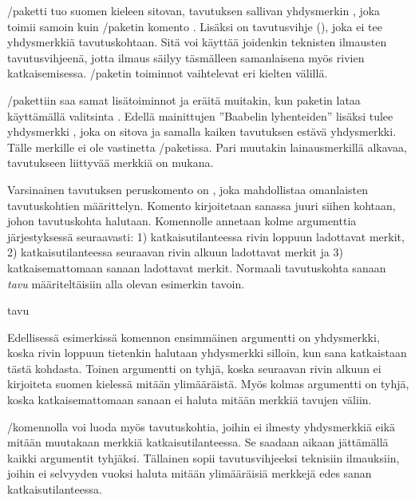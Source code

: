 \-/paketti tuo suomen kieleen sitovan, tavutuksen
sallivan yhdysmerkin \koodi{\textquotedbl-}, joka toimii samoin kuin
\-/paketin komento \koodi{\keno=/}. Lisäksi on
tavutusvihje (\koodi{\textquotedbl\textquotedbl}), joka ei tee
yhdysmerkkiä tavutuskohtaan. Sitä voi käyttää joidenkin teknisten
ilmausten tavutusvihjeenä, jotta ilmaus säilyy täsmälleen samanlaisena
myös rivien katkaisemisessa. \-/paketin toiminnot
vaihtelevat eri kielten välillä.

\-/pakettiin saa samat lisätoiminnot ja eräitä
muitakin, kun paketin lataa käyttämällä valitsinta
. Edellä mainittujen ''Baabelin lyhenteiden''
lisäksi tulee yhdysmerkki \koodi{\textquotedbl\textasciitilde}, joka on
sitova ja samalla kaiken tavutuksen estävä yhdysmerkki. Tälle merkille
ei ole vastinetta \-/paketissa. Pari muutakin
lainausmerkillä alkavaa, tavutukseen liittyvää merkkiä on mukana.

Varsinainen%
 tavutuksen peruskomento on
, joka mahdollistaa omanlaisten
tavutuskohtien määrittelyn. Komento kirjoitetaan sanassa juuri siihen
kohtaan, johon tavutuskohta halutaan. Komennolle annetaan kolme
argumenttia järjestyksessä seuraavasti: 1) katkaisutilanteessa rivin
loppuun ladottavat merkit, 2) katkaisutilanteessa seuraavan rivin alkuun
ladottavat merkit ja 3) katkaisemattomaan sanaan ladottavat merkit.
Normaali tavutuskohta sanaan \emph{tavu} määriteltäisiin alla olevan
esimerkin tavoin.

\begin{koodilohkosis}
  ta\discretionary{-}{}{}vu
\end{koodilohkosis}

Edellisessä esimerkissä komennon ensimmäinen argumentti on yhdysmerkki,
koska rivin loppuun tietenkin halutaan yhdysmerkki silloin, kun sana
katkaistaan tästä kohdasta. Toinen argumentti on tyhjä, koska seuraavan
rivin alkuun ei kirjoiteta suomen kielessä mitään ylimääräistä. Myös
kolmas argumentti on tyhjä, koska katkaisemattomaan sanaan ei haluta
mitään merkkiä tavujen väliin.

\-/komennolla voi luoda myös tavutuskohtia,
joihin ei ilmesty yhdysmerkkiä eikä mitään muutakaan merkkiä
katkaisutilanteessa. Se saadaan aikaan jättämällä kaikki argumentit
tyhjäksi. Tällainen sopii tavutusvihjeeksi teknisiin ilmauksiin, joihin
ei selvyyden vuoksi haluta mitään ylimääräisiä merkkejä edes sanan
katkaisutilanteessa.

